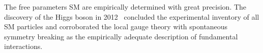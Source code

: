 The free parameters SM are empirically determined with great precision. The discovery of the Higgs boson in 2012~\cite{HIGG-2012-27,CMS-HIG-12-028} concluded the experimental inventory of all SM particles and corroborated the local gauge theory with spontaneous symmetry breaking as the empirically adequate description of fundamental interactions.



